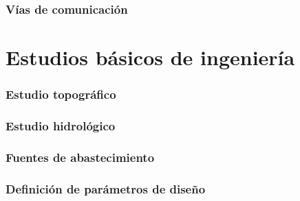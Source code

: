         \subsubsection{Vías de comunicación}
    \section{Estudios básicos de ingeniería}
        \subsubsection{Estudio topográfico}
        \subsubsection{Estudio hidrológico}
        \subsubsection{Fuentes de abastecimiento}
        \subsubsection{Definición de parámetros de diseño}
        
